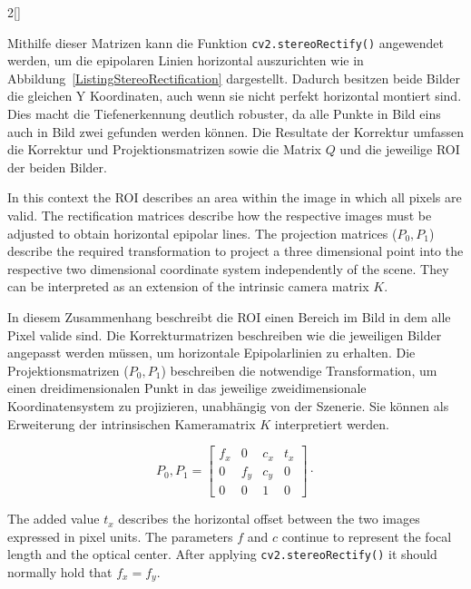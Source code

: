 \begin{paracol}{2}[]
\colger

Mithilfe dieser Matrizen kann die Funktion \texttt{cv2.stereoRectify()} angewendet werden, um die epipolaren Linien horizontal auszurichten wie in Abbildung~\ref{ListingStereoRectification} dargestellt. Dadurch besitzen beide Bilder die gleichen Y Koordinaten, auch wenn sie nicht perfekt horizontal montiert sind. Dies macht die Tiefenerkennung deutlich robuster, da alle Punkte in Bild eins auch in Bild zwei gefunden werden können. Die Resultate der Korrektur umfassen die Korrektur und Projektionsmatrizen sowie die Matrix $Q$ und die jeweilige ROI der beiden Bilder.

\coleng

In this context the ROI describes an area within the image in which all pixels are valid. The rectification matrices describe how the respective images must be adjusted to obtain horizontal epipolar lines. The projection matrices ($P_0, P_1$) describe the required transformation to project a three dimensional point into the respective two dimensional coordinate system independently of the scene. They can be interpreted as an extension of the intrinsic camera matrix $K$.

\colger

In diesem Zusammenhang beschreibt die ROI einen Bereich im Bild in dem alle Pixel valide sind. Die Korrekturmatrizen beschreiben wie die jeweiligen Bilder angepasst werden müssen, um horizontale Epipolarlinien zu erhalten. Die Projektionsmatrizen ($P_0, P_1$) beschreiben die notwendige Transformation, um einen dreidimensionalen Punkt in das jeweilige zweidimensionale Koordinatensystem zu projizieren, unabhängig von der Szenerie. Sie können als Erweiterung der intrinsischen Kameramatrix $K$ interpretiert werden.

\colende

$$ P_0, P_1 = \begin{bmatrix}
	f_x & 0 & c_x & t_x \\
	0 & f_y & c_y & 0 \\
	0 & 0 & 1 & 0
\end{bmatrix}· $$

\colstart

The added value $t_x$ describes the horizontal offset between the two images expressed in pixel units. The parameters $f$ and $c$ continue to represent the focal length and the optical center. After applying \texttt{cv2.stereoRectify()} it should normally hold that $f_x = f_y$.

\colger


\end{paracol}
